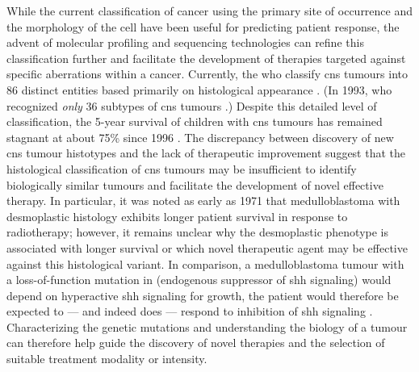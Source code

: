 While the current classification of cancer using the primary site of occurrence and the morphology of the cell have been useful for predicting patient response, the advent of molecular profiling and sequencing technologies can refine this classification further and facilitate the development of therapies targeted against specific aberrations within a cancer. Currently, the \gls{who} classify \gls{cns} tumours into 86 distinct entities based primarily on histological appearance . (In 1993, \gls{who} recognized \emph{only} 36 subtypes of \gls{cns} tumours .) Despite this detailed level of classification, the 5-year survival of children with \gls{cns} tumours has remained stagnant at about 75\% since 1996 . The discrepancy between discovery of new \gls{cns} tumour histotypes and the lack of therapeutic improvement suggest that the histological classification of \gls{cns} tumours may be insufficient to identify biologically similar tumours and facilitate the development of novel effective therapy. In particular, it was noted as early as 1971 that medulloblastoma with desmoplastic histology exhibits longer patient survival  in response to radiotherapy; however, it remains unclear why the desmoplastic phenotype is associated with longer survival or which novel therapeutic agent may be effective against this histological variant. In comparison, a medulloblastoma tumour with a loss-of-function mutation in  (endogenous suppressor of \gls{shh} signaling) would depend on hyperactive \gls{shh} signaling for growth, the patient would therefore be expected to --- and indeed does --- respond to inhibition of \gls{shh} signaling . Characterizing the genetic mutations and understanding the biology of a tumour can therefore help guide the discovery of novel therapies and the selection of suitable treatment modality or intensity.

